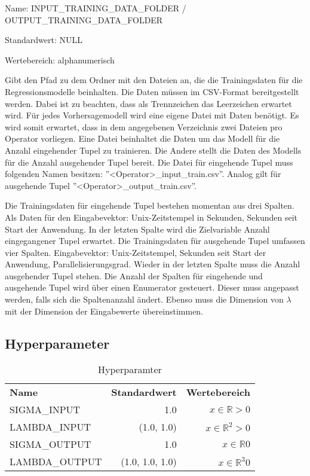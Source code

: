 Name: INPUT\_TRAINING\_DATA\_FOLDER / OUTPUT\_TRAINING\_DATA\_FOLDER

Standardwert: NULL

Wertebereich: alphanumerisch

Gibt den Pfad zu dem Ordner mit den Dateien an, die die Trainingsdaten für die Regressionsmodelle beinhalten.
Die Daten müssen im CSV-Format bereitgestellt werden.
Dabei ist zu beachten, dass als Trennzeichen das Leerzeichen erwartet wird.
Für jedes Vorhersagemodell wird eine eigene Datei mit Daten benötigt.
Es wird somit erwartet, dass in dem angegebenen Verzeichnis zwei Dateien pro Operator vorliegen.
Eine Datei beinhaltet die Daten um das Modell für die Anzahl eingehender Tupel zu trainieren.
Die Andere stellt die Daten des Modells für die  Anzahl ausgehender Tupel bereit.
Die Datei für eingehende Tupel muss folgenden Namen besitzen: ''<Operator>\_input\_train.csv''.
Analog gilt für ausgehende Tupel ''<Operator>\_output\_train.csv''.

Die Trainingsdaten für eingehende Tupel bestehen momentan aus drei Spalten.
Als Daten für den Eingabevektor: Unix-Zeitstempel in Sekunden, Sekunden seit Start der Anwendung.
In der letzten Spalte wird die Zielvariable Anzahl eingegangener Tupel erwartet.
Die Trainingsdaten für ausgehende Tupel umfassen vier Spalten.
Eingabevektor: Unix-Zeitstempel, Sekunden seit Start der Anwendung, Parallelisierungsgrad.
Wieder in der letzten Spalte muss die Anzahl ausgehender Tupel stehen.
Die Anzahl der Spalten für eingehende und ausgehende Tupel wird über einen Enumerator gesteuert.
Dieser muss angepasst werden, falls sich die Spaltenanzahl ändert.
Ebenso muss die Dimension von \(\lambda\) mit der Dimension der Eingabewerte übereinstimmen.

\subsection{Hyperparameter}

\begin{table}[!htbp]
\centering
\caption{Hyperparamter}
\begin{tabular}{l|r|r}
\hline
\textbf{Name} & \textbf{Standardwert} & \textbf{Wertebereich} \\
SIGMA\_INPUT & 1.0 & \(x \in \mathbb{R} > 0 \) \\
LAMBDA\_INPUT & (1.0, 1.0) &  \(x \in \mathbb{R}^2 > 0 \) \\
SIGMA\_OUTPUT & 1.0 & \(x \in \mathbb{R} 0 \) \\
LAMBDA\_OUTPUT & (1.0, 1.0, 1.0) & \(x \in \mathbb{R}^3 0\) \\
\hline
\end{tabular}
\end{table}

